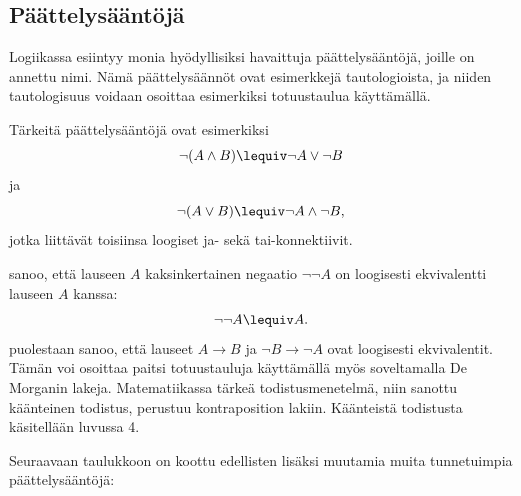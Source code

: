 \bigskip


\subsection*{Päättelysääntöjä} Logiikassa esiintyy monia hyödyllisiksi havaittuja päättelysääntöjä, joille on annettu nimi. Nämä päättelysäännöt ovat esimerkkejä tautologioista, ja niiden tautologisuus voidaan osoittaa esimerkiksi totuustaulua käyttämällä.

Tärkeitä päättelysääntöjä ovat esimerkiksi 
\[
\lnot(A \land B) \lequiv \lnot A \lor \lnot B
\]
ja
\[
\lnot(A \lor B) \lequiv \lnot A \land \lnot B,
\]
jotka liittävät toisiinsa loogiset ja- sekä tai-konnektiivit.

 sanoo, että lauseen $A$ kaksinkertainen negaatio $\lnot \lnot A$ on loogisesti ekvivalentti lauseen $A$ kanssa:
\[
\lnot \lnot A \lequiv A.
\]
 puolestaan sanoo, että lauseet $A\to B$ ja $\lnot B \to \lnot A$ ovat loogisesti ekvivalentit. Tämän voi osoittaa paitsi totuustauluja käyttämällä myös soveltamalla De Morganin lakeja.
Matematiikassa tärkeä todistusmenetelmä, niin sanottu käänteinen todistus, perustuu kontraposition lakiin. Käänteistä todistusta käsitellään luvussa 4.


Seuraavaan taulukkoon on koottu edellisten lisäksi muutamia muita tunnetuimpia päättelysääntöjä: %

\bigskip



